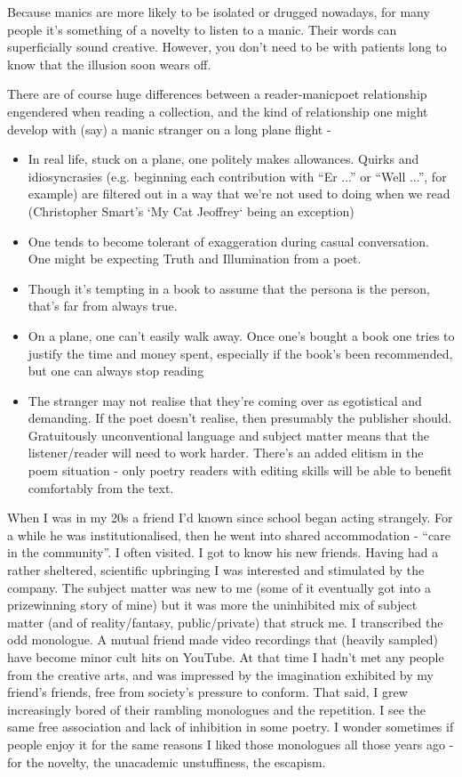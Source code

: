 \documentclass[11pt]{article}
\begin{document}
Because manics are more likely to be isolated or drugged nowadays, for many people it's something of a novelty to listen to a manic. Their words can superficially sound creative. However, you don't need to be with patients long to know that the illusion soon wears off.


There are of course huge differences between a reader-manicpoet relationship engendered when reading a collection, and the kind of relationship one might develop with (say) a manic stranger on a long plane flight -
\begin{itemize}
\item In real life, stuck on a plane, one politely makes allowances. Quirks and idiosyncrasies (e.g. beginning each contribution with ``Er ...'' or ``Well ...'', for example) are filtered out in a way that we're not used to doing when we read (Christopher Smart's ‘My Cat Jeoffrey‘ being an exception)
\item One tends to become tolerant of exaggeration during casual conversation. One might be expecting Truth and Illumination from a poet.
\item Though it's tempting in a book to assume that the persona is the person, that's far from always true.

\item On a plane, one can't easily walk away. Once one's bought a book one tries to justify the time and money spent, especially if the book's been recommended, but one can always stop reading
\item The stranger may not realise that they're coming over as egotistical and demanding. If the poet doesn't realise, then presumably the publisher should. Gratuitously unconventional language and subject matter means that the listener/reader will need to work harder. There's an added elitism in the poem situation - only  poetry readers with editing skills will be able to benefit comfortably from the text.
 
\end{itemize}


When I was in my 20s a friend I'd known since school began acting strangely. For a while he was institutionalised, then he went into shared accommodation - ``care in the community''. I often visited. I got to know his new friends. Having had a rather sheltered, scientific upbringing I was interested and stimulated by the company. The subject matter was new to me (some of it eventually got into a prizewinning story of mine) but it was more the uninhibited mix of subject matter (and of reality/fantasy, public/private) that struck me. I transcribed the odd monologue. A mutual friend made video recordings that (heavily sampled) have become minor cult hits on YouTube. At that time I hadn't met any people from the creative arts, and was impressed by the imagination exhibited by my friend's friends, free from society's pressure to conform. That said, I grew increasingly bored of their rambling monologues and the repetition. I see the same free association and lack of inhibition in some poetry. I wonder sometimes if people enjoy it for the same reasons I liked those monologues all those years ago - for the novelty, the unacademic unstuffiness, the escapism. 
\end{document}
